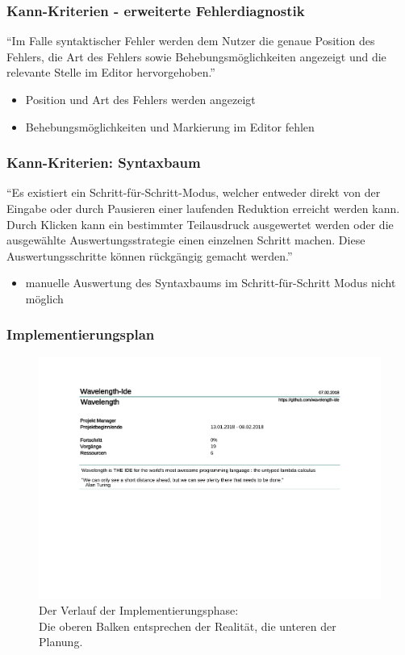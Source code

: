 \documentclass[10pt]{beamer}
\begin{document}
\begin{frame}[plain]
\frametitle{Kann-Kriterien - \alert{erweiterte Fehlerdiagnostik}}
\enquote{Im Falle syntaktischer Fehler werden dem Nutzer die genaue Position des Fehlers, die
Art des Fehlers sowie Behebungsmöglichkeiten angezeigt und die relevante Stelle im
Editor hervorgehoben.}
\begin{itemize}
\item Position und Art des Fehlers werden angezeigt
\item Behebungsmöglichkeiten und Markierung im Editor fehlen
\end{itemize}
\end{frame}

\begin{frame}[plain]
\frametitle{Kann-Kriterien: \alert{Syntaxbaum}}
\enquote{Es existiert ein Schritt-für-Schritt-Modus, welcher entweder direkt von der Eingabe
oder durch Pausieren einer laufenden Reduktion erreicht werden kann.
Durch Klicken kann ein bestimmter Teilausdruck ausgewertet werden oder die ausgewählte
Auswertungsstrategie einen einzelnen Schritt machen. Diese Auswertungsschritte können rückgängig
gemacht werden.}
\begin{itemize}
\item manuelle Auswertung des Syntaxbaums im Schritt-für-Schritt Modus nicht möglich
\end{itemize}
\end{frame}

\begin{frame}[plain]
\frametitle{Implementierungsplan}
\begin{figure}[H]
\includegraphics[trim={0, 7cm, 0, 0}, clip, scale=0.4, page=4]{Implementierungsplan/Implementierungsplan.pdf}
\caption[caption]{Der Verlauf der Implementierungsphase: \\\hspace{\textwidth}
Die oberen Balken entsprechen der Realität, die unteren der Planung.}
\end{figure}
\end{frame}

\begin{frame}[plain]

\end{frame}

\begin{frame}[plain]

\end{frame}
\end{document}
